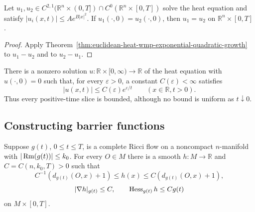 \begin{theorem}
\label{thm:euclidean-heat-uniqueness-exponential-quadratic-growth}
Let $u_1,u_2\in C^{2,1}(\mathbb R^n\times(0,T])\cap
C^0(\mathbb R^n\times[0,T])$ solve the heat equation and satisfy
$|u_i(x,t)|\leq Ae^{B|x|^2}$.  If $u_1(\cdot,0)=u_2(\cdot,0)$, then
$u_1=u_2$ on $\mathbb R^n\times[0,T]$.
\end{theorem}

\begin{proof}
Apply Theorem~\ref{thm:euclidean-heat-wmp-exponential-quadratic-growth} to
$u_1-u_2$ and to $u_2-u_1$.
\end{proof}

\begin{theorem}
\label{thm:heat-nonuniqueness-slicewise-bounded}
There is a nonzero solution $u:\mathbb R\times[0,\infty)\to\mathbb R$ of the
heat equation with $u(\cdot,0)=0$ such that, for every $\varepsilon>0$, a
constant $C(\varepsilon)<\infty$ satisfies
\[
|u(x,t)|\leq C(\varepsilon)e^{\varepsilon/t}
\qquad(x\in\mathbb R, t>0).
\]
Thus every positive-time slice is bounded, although no bound is uniform as
$t\downarrow0$.
\end{theorem}

\subsection{Constructing barrier functions}

\begin{lemma}
\label{lem:ricci-flow-distance-like-function}
Suppose $g(t)$, $0\leq t\leq T$, is a complete Ricci flow on a noncompact
$n$-manifold with $|\operatorname{Rm}(g(t))|\leq k_0$.  For every $O\in M$ there is a smooth
$h:M\to\mathbb R$ and $C=C(n,k_0,T)>0$ such that
\[
C^{-1}(d_{g(t)}(O,x)+1)\leq h(x)\leq C(d_{g(t)}(O,x)+1),
\]
\[
|\nabla h|_{g(t)}\leq C,\qquad \operatorname{Hess}_{g(t)}h\leq Cg(t)
\]
on $M\times[0,T]$.
\end{lemma}

